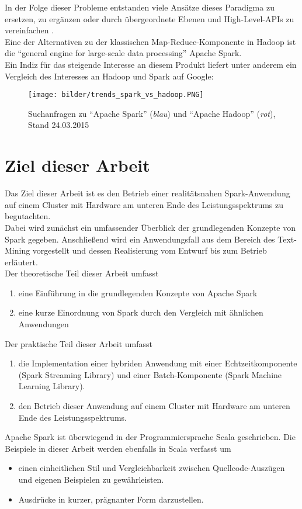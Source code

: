 In der Folge dieser Probleme entstanden viele Ansätze dieses Paradigma zu ersetzen, zu ergänzen oder durch übergeordnete Ebenen und High-Level-APIs zu vereinfachen \cite{Sin14}.\\

Eine der Alternativen zu der klassischen Map-Reduce-Komponente in Hadoop ist die "`general engine for large-scale data processing"' Apache Spark.\\

Ein Indiz für das steigende Interesse an diesem Produkt liefert unter anderem ein Vergleich des Interesses an Hadoop und Spark auf Google:\\

\begin{figure}[h]
\texttt{[image: bilder/trends\_spark\_vs\_hadoop.PNG]}
\caption[Google Trends]{Suchanfragen zu "`Apache Spark"' (\textit{blau}) und "`Apache Hadoop"' (\textit{rot}), Stand 24.03.2015 \cite{googletrends}}
\end{figure}

\section{Ziel dieser Arbeit}
Das Ziel dieser Arbeit ist es den Betrieb einer realitätsnahen Spark-Anwendung auf einem Cluster mit Hardware am unteren Ende des Leistungsspektrums zu begutachten.\\
Dabei wird zunächst ein umfassender Überblick der grundlegenden Konzepte von Spark gegeben. Anschließend wird ein Anwendungsfall aus dem Bereich des Text-Mining vorgestellt und dessen Realisierung vom Entwurf bis zum Betrieb erläutert.\\

Der theoretische Teil dieser Arbeit umfasst
\begin{enumerate}
  \item eine Einführung in die grundlegenden Konzepte von Apache Spark 
	\item eine kurze Einordnung von Spark durch den Vergleich mit ähnlichen Anwendungen
\end{enumerate}

Der praktische Teil dieser Arbeit umfasst
\begin{enumerate}
\item die Implementation einer hybriden Anwendung mit einer Echtzeitkomponente (Spark Streaming Library) und einer Batch-Komponente (Spark Machine Learning Library).
\item den Betrieb dieser Anwendung auf einem Cluster mit Hardware am unteren Ende des Leistungsspektrums.
\end{enumerate}

Apache Spark ist überwiegend in der Programmiersprache Scala geschrieben. Die Beispiele in dieser Arbeit werden ebenfalls in Scala verfasst um
\begin{itemize}
	\item einen einheitlichen Stil und Vergleichbarkeit zwischen Quellcode-Auszügen und eigenen Beispielen zu gewährleisten.
	\item Ausdrücke in kurzer, prägnanter Form darzustellen.
\end{itemize}
